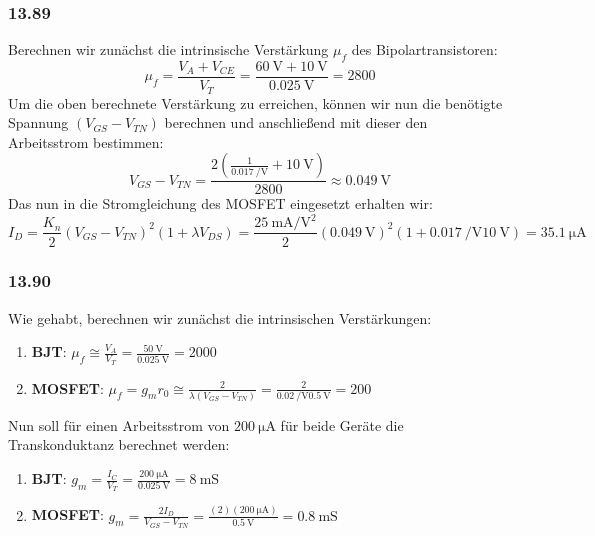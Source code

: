 \documentclass[11pt,a4paper,titlepage]{article}
\begin{document}
\subsubsection*{13.89}
Berechnen wir zunächst die intrinsische Verstärkung $\mu_f$ des Bipolartransistoren:
\[ \mu_f = \frac{V_A + V_{CE}}{V_T} = \frac{\SI{60}{\volt} + \SI{10}{\volt}}{\SI{0.025}{\volt}} = 2800 \]
Um die oben berechnete Verstärkung zu erreichen, können wir nun die benötigte Spannung $(V_{GS}-V_{TN})$ berechnen und anschließend mit dieser den Arbeitsstrom bestimmen:
\[ V_{GS}-V_{TN} = \frac{2 \left( \frac{1}{\SI{0.017}{\per\volt}} +\SI{10}{\volt} \right)}{2800} \approx \SI{0.049}{\volt}  \]
Das nun in die Stromgleichung des MOSFET eingesetzt erhalten wir:
\[ I_D = \frac{K_n}{2} \left( V_{GS} - V_{TN} \right)^2(1+\lambda V_{DS}) = \frac{\SI{25}{\milli\ampere\per\square\volt}}{2} (\SI{0.049}{\volt})^2(1+ \SI{0.017}{\per\volt} \SI{10}{\volt}) = \SI{35.1}{\micro\ampere} \]

\subsubsection*{13.90}
Wie gehabt, berechnen wir zunächst die intrinsischen Verstärkungen:
\begin{enumerate}
	\item \textbf{BJT}: $\mu_f \cong \frac{V_A}{V_T} = \frac{\SI{50}{\volt}}{\SI{0.025}{\volt}} = 2000$
	\item \textbf{MOSFET}: $\mu_f = g_mr_0 \cong \frac{2}{\lambda(V_{GS}-V_{TN})} = \frac{2}{\SI{0.02}{\per\volt}\SI{0.5}{\volt}} = 200$
\end{enumerate}
Nun soll für einen Arbeitsstrom von $\SI{200}{\micro\ampere}$ für beide Geräte die Transkonduktanz berechnet werden:
\begin{enumerate}
	\item \textbf{BJT}: $g_m = \frac{I_C}{V_T} = \frac{\SI{200}{\micro\ampere}}{\SI{0.025}{\volt}} = \SI{8}{\milli\siemens}$
	\item \textbf{MOSFET}: $g_m = \frac{2I_D}{V_{GS}-V_{TN}} = \frac{(2)(\SI{200}{\micro\ampere})}{\SI{0.5}{\volt}} = \SI{0.8}{\milli\siemens}$
\end{enumerate}
\end{document}
